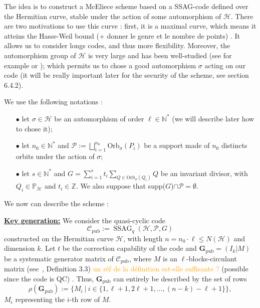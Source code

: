 \documentclass[10pt]{article}
\theoremstyle{definition}
\theoremstyle{definition}
\theoremstyle{definition}
\newcommand{\s}{\vspace{0.3cm}}
\newcommand{\cd}{\cdot}
\newcommand{\N}{\mathbb{N}}
\newcommand{\Z}{\mathbb{Z}}
\newcommand{\PP}{\mathbb{P}}
\newcommand{\PR}{\mathcal{P}}
\newcommand{\ssag}{\operatorname{SSAG}}
\newcommand{\note}[1]{\textcolor{orange}{#1}}
\begin{document}
The idea is to construct a McEliece scheme based on a SSAG-code defined over the Hermitian curve, stable under the action of some automorphism of $\mathcal{H}$. There are two motivations to use this curve : first, it is a maximal curve, \color{purple}which means it atteins the Hasse-Weil bound (+ donner le genre et le nombre de points) \color{black}. It allows us to consider longs codes, and thus more flexibility. Moreover, the automorphism group of $\mathcal{H}$ is very large and has been well-studied (see for example \cite{Sti} or \cite{Gar}); which permits us to chose a good automorphism $\sigma$ acting on our code (it will be really important later for the security of the scheme, see section 6.4.2). 

\s

We use the following notations : 
\begin{enumerate}
\item[$\bullet$] let $\sigma \in \mathcal{H}$ be an automorphism of order $\ell \in \N^*$ (we will describe later how to chose it);
\item[$\bullet$] let $n_0 \in \N^* $ and $\PR := \bigsqcup\limits_{i=1}^{n_0} \mathrm{Orb}_{\sigma}(P_i)$ be a support made of $n_0$ distincts orbits under the action of $\sigma$;
\item[$\bullet$] let $s \in \N^*$ and $G = \sum\limits_{i=1}^s t_i \sum\limits_{Q \in \mathrm{Orb}_{\sigma}(Q_i)} Q$ be an invariant divisor, with $Q_i \in \PP_{\mathcal{H}}$ and $t_i \in \Z$. We also suppose that supp($G$)$\cap \PR = \emptyset$.
\end{enumerate}

We now can describe the scheme :

\s 

\underline{\textbf{Key generation:}} We consider the quasi-cyclic code 
\[\mathcal{C}_{\mathrm{pub}} := \ssag_q(\mathcal{H},\PR,G)\]
constructed on the Hermitian curve $\mathcal{H}$, with length $n=n_0 \cd \ell\leq N(\mathcal{H})$ and dimension $k$. Let $t$ be the correction capability of the code and $\mathbf{G}_{\mathrm{pub}} = (I_k | M)$ be a systematic generator matrix of $\mathcal{C}_{\mathrm{pub}}$, where $M$ is an \color{purple} $\ell$-blocks-circulant matrix (see~\cite{Bar}, Definition 3.3) \color{black} \note{un réf de la définition est-elle suffisante ?} (possible since the code is QC) . Thus, $\mathbf{G}_{\mathrm{pub}}$ can entirely be described by the set of rows
\[\rho(\mathbf{G}_{\mathrm{pub}}) := \{M_i \ | \ i \in \{1,\ell+1,2\ell+1,...,(n-k)-\ell+1\}\},\]
$M_i$ representing the $i$-th row of $M$. 
\end{document}
